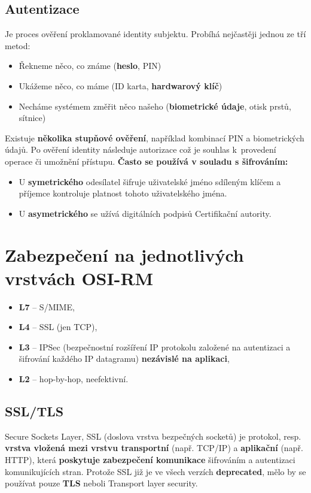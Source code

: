 \subsection{Autentizace}
Je proces ověření proklamované identity subjektu. Probíhá nejčastěji jednou ze tří metod:
\begin{itemize}
    \item Řekneme něco, co známe (\textbf{heslo}, PIN)
    \item Ukážeme něco, co máme (ID karta, \textbf{hardwarový klíč})
    \item Necháme systémem změřit něco našeho (\textbf{biometrické údaje}, otisk prstů, sítnice)
\end{itemize}
Existuje \textbf{několika stupňové ověření}, například kombinací PIN a biometrických údajů. Po ověření identity následuje autorizace což je souhlas k provedení operace či umožnění přístupu. \textbf{Často se používá v souladu s šifrováním:}
\begin{itemize}
    \item U \textbf{symetrického} odesílatel šifruje uživatelské jméno sdíleným klíčem a příjemce kontroluje platnost tohoto uživatelského jména.
    \item U \textbf{asymetrického} se užívá digitálních podpisů Certifikační autority.
\end{itemize}



\section{Zabezpečení na jednotlivých vrstvách OSI-RM }
\begin{itemize}
    \item \textbf{L7} – S/MIME,
    \item \textbf{L4} – SSL (jen TCP),
    \item \textbf{L3} – IPSec (bezpečnostní rozšíření IP protokolu založené na autentizaci a šifrování každého IP datagramu) \textbf{nezávislé na aplikaci},
    \item \textbf{L2} – hop-by-hop, neefektivní.
\end{itemize}


\subsection{SSL/TLS}
Secure Sockets Layer, SSL (doslova vrstva bezpečných socketů) je protokol, resp. \textbf{vrstva vložená mezi vrstvu transportní} (např. TCP/IP) a \textbf{aplikační} (např. HTTP), která \textbf{poskytuje zabezpečení komunikace} šifrováním a autentizaci komunikujících stran. Protože SSL již je ve všech verzích \textbf{deprecated}, mělo by se používat pouze \textbf{TLS} neboli Transport layer security.

